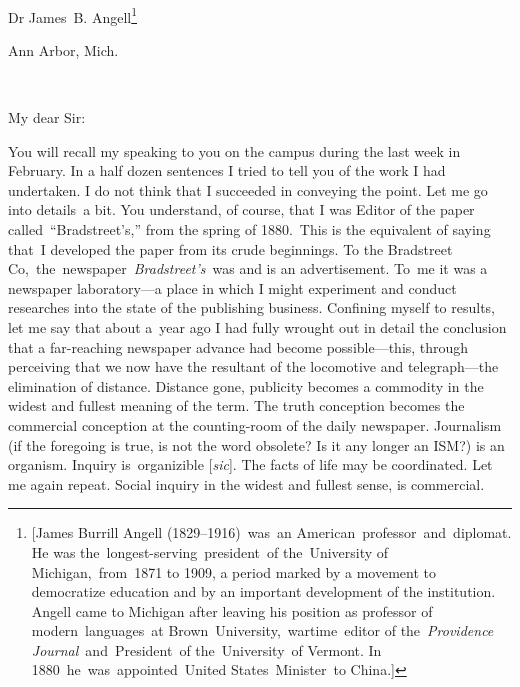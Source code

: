 \documentclass[openany,nobib]{tufte-book}
\begin{document}
~

\noindent Dr James~B. Angell\footnote{{[}James Burrill Angell (1829--1916)~was~an
  American~professor~and~diplomat. He was
  the~longest-serving~president~of the~University of Michigan,~from~1871
  to 1909, a period marked by a movement to democratize education and by
  an important development of the institution. Angell came to Michigan
  after leaving his position as professor of modern~languages~at
  Brown~University,~wartime~editor of the~\emph{Providence
  Journal}~and~President~of the~University~of Vermont. In
  1880~he~was~appointed~United States~Minister~to China.{]}}~

Ann Arbor, Mich.~

~

\noindent My dear Sir:~


You will recall my speaking to you on the campus during the last week in
February. In a half dozen sentences I tried to tell you of the work I
had undertaken. I do not think that I succeeded in conveying the point.
Let me go into details~a bit. You understand, of course, that I was
Editor of the paper called~``Bradstreet's,'' from the spring of
1880.~This is the equivalent of saying that~I developed the paper from
its crude beginnings. To the Bradstreet
Co,~the~newspaper~\emph{Bradstreet's}~was and is an advertisement. To~me
it was a newspaper laboratory---a place in which I might experiment and
conduct researches into the state of the publishing business. Confining
myself to results, let me say that about a~year ago I had fully wrought
out in detail the conclusion that a far-reaching newspaper advance had
become possible---this, through perceiving that we now have the
resultant of the locomotive and telegraph---the elimination of distance.
Distance gone, publicity becomes a commodity in the widest and fullest
meaning of the term. The truth conception becomes the commercial
conception at the counting-room of the daily newspaper. Journalism (if
the foregoing is true, is not the word obsolete? Is it any longer an
ISM?) is an organism. Inquiry is~organizible {[}\emph{sic}{]}. The facts
of life may be coordinated. Let me again repeat. Social inquiry in the
widest and fullest sense, is commercial.~
\end{document}
